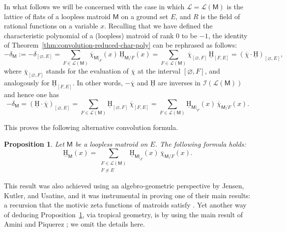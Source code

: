 \documentclass[11pt, a4paper, english]{amsart}
\theoremstyle{teoremas}
\newtheorem{proposition}[theorem]{Proposition}
\theoremstyle{definition}
\newcommand{\M}{\mathsf{M}}
\newcommand{\uH}{\underline{\mathrm{H}}}
\begin{document}
In what follows we will be concerned with the case in which $\mathcal{L}=\mathcal{L}(\M)$ is the lattice of flats of a loopless matroid $\M$ on a ground set $E$, and $R$ is the field of rational functions on a variable $x$. Recalling that we have defined the characteristic polynomial of a (loopless) matroid of rank $0$ to be $-1$, the identity of Theorem~\ref{thm:convolution-reduced-char-poly} can be rephrased as follows: 
    \[ -\delta_{\M} := -\delta_{[\varnothing,E]}= \sum_{F\in\mathcal{L}(\M)} \overline{\chi}_{\M|_F}(x)\, \uH_{\M/F}(x) = \sum_{F\in\mathcal{L}(\M)} \overline{\chi}_{[\varnothing, F]} \, \uH_{[F,E]} = (\overline{\chi}\cdot \uH)_{[\varnothing,E]},\]
where $\overline{\chi}_{[\varnothing,F]}$ stands for the evaluation of $\overline{\chi}$ at the interval $[\varnothing, F]$, and analogously for $\uH_{[F,E]}$. In other words, $-\overline{\chi}$ and $\uH$ are inverses in $\mathcal{I}(\mathcal{L}(\M))$ and hence one has
    \[ -\delta_{\M} = (\uH\cdot \overline{\chi})_{[\varnothing, E]} = \sum_{F\in \mathcal{L}(\M)} \uH_{[\varnothing, F]}\, \overline{\chi}_{[F,E]} = \sum_{F\in\mathcal{L}(\M)} \uH_{\M|_F}(x)\, \overline{\chi}_{\M/F}(x).\]

This proves the following alternative convolution formula.

\begin{proposition}\label{prop:hilbert-chow-inverse-incidence}
    Let $\M$ be a loopless matroid on $E$. The following formula holds:
    \[ \uH_{\M}(x) = \sum_{\substack{F\in\mathcal{L}(\M)\\F\neq E}} \uH_{\M|_F}(x)\, \overline{\chi}_{\M/F}(x).\]
\end{proposition}

This result was also achieved using an  algebro-geometric perspective by Jensen, Kutler, and Usatine, and it was instrumental in proving one of their main results: a recursion that the motivic zeta functions of matroids satisfy \cite[Theorem~1.8]{jensen-kutler-usatine}.  Yet another way of deducing Proposition~\ref{prop:hilbert-chow-inverse-incidence}, via tropical geometry, is by using the main result of Amini and Piquerez \cite[Theorem~1.1]{amini-piquerez}; we omit the details here. 

\end{document}
